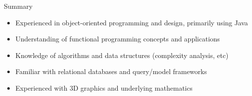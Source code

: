 \cvitem
    {Summary}
    {\begin{itemize}
        \item Experienced in object-oriented programming and design, primarily using Java
        \item Understanding of functional programming concepts and applications
        \item Knowledge of algorithms and data structures (complexity analysis, etc)
        \item Familiar with relational databases and query/model frameworks
        \item Experienced with 3D graphics and underlying mathematics
    \end{itemize}}
    \vspace*{-\baselineskip}